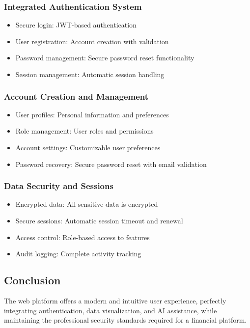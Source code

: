 \documentclass[12pt,a4paper]{article}
\begin{document}
\subsubsection{Integrated Authentication System}
\begin{itemize}
    \item Secure login: JWT-based authentication
    \item User registration: Account creation with validation
    \item Password management: Secure password reset functionality
    \item Session management: Automatic session handling
\end{itemize}

\subsubsection{Account Creation and Management}
\begin{itemize}
    \item User profiles: Personal information and preferences
    \item Role management: User roles and permissions
    \item Account settings: Customizable user preferences
    \item Password recovery: Secure password reset with email validation
\end{itemize}

\subsubsection{Data Security and Sessions}
\begin{itemize}
    \item Encrypted data: All sensitive data is encrypted
    \item Secure sessions: Automatic session timeout and renewal
    \item Access control: Role-based access to features
    \item Audit logging: Complete activity tracking
\end{itemize}

\subsection{Conclusion}
The web platform offers a modern and intuitive user experience, perfectly integrating authentication, data visualization, and AI assistance, while maintaining the professional security standards required for a financial platform.
\end{document}
